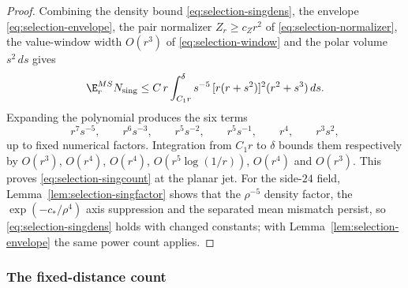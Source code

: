 \begin{proof}
Combining the density bound \eqref{eq:selection-singdens}, the envelope \eqref{eq:selection-envelope}, the pair normalizer $Z_r\ge c_Zr^2$ of \eqref{eq:selection-normalizer}, the value-window width $O(r^3)$ of \eqref{eq:selection-window} and the polar volume $s^2\,ds$ gives
\begin{equation}\label{eq:selection-singint}
\E^{MS}_rN_{\rm sing}\le C\,r\int_{C_1r}^{\delta}s^{-5}\,[r(r+s^2)]^2(r^2+s^3)\,ds .
\end{equation}
Expanding the polynomial produces the six terms
\begin{equation}\label{eq:selection-sixterms}
r^7s^{-5},\qquad r^6s^{-3},\qquad r^5s^{-2},\qquad r^5s^{-1},\qquad r^4,\qquad r^3s^2,
\end{equation}
up to fixed numerical factors. Integration from $C_1r$ to $\delta$ bounds them respectively by $O(r^3)$, $O(r^4)$, $O(r^4)$, $O(r^5\log(1/r))$, $O(r^4)$ and $O(r^3)$. This proves \eqref{eq:selection-singcount} at the planar jet. For the side-$24$ field, Lemma~\ref{lem:selection-singfactor} shows that the $\rho^{-5}$ density factor, the $\exp(-c_*/\rho^4)$ axis suppression and the separated mean mismatch persist, so \eqref{eq:selection-singdens} holds with changed constants; with Lemma~\ref{lem:selection-envelope} the same power count applies.
\end{proof}

\subsubsection{The fixed-distance count}

